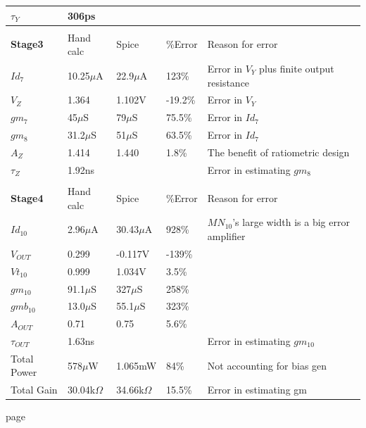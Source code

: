 \documentclass[12pt,a4paper]{article}
\begin{document}
\begin{table}[h]
\begin{tabular}{|l|l|l|l|l|}
\hline
$\tau_Y$ & 306ps  &   &   &   \\
\hline
  &   &   &   &   \\
\hline
\textbf{Stage3} & Hand calc & Spice & \%Error & Reason for error \\
\hline
$Id_7$ & 10.25$\mu$A  & 22.9$\mu$A  & 123\%  & Error in $V_Y$ plus finite output resistance  \\
\hline
$V_Z$ & 1.364 & 1.102V  & -19.2\%  & Error in $V_Y$   \\
\hline
$gm_7$ & 45$\mu$S  & 79$\mu$S  & 75.5\%  &  Error in $Id_7$ \\
\hline
$gm_8$ & 31.2$\mu$S & 51$\mu$S   &  63.5\% &  Error in $Id_7$  \\
\hline
$A_Z$ & 1.414  & 1.440  & 1.8\%  &  The benefit of ratiometric design \\
\hline
$\tau_Z$ & 1.92ns  &   &   &  Error in estimating $gm_{8}$ \\
\hline
  &   &   &   &   \\
\hline
\textbf{Stage4} & Hand calc & Spice & \%Error & Reason for error \\
\hline
$Id_{10}$ & 2.96$\mu$A  &  30.43$\mu$A &  928\% & $MN_{10}$'s large width is a big error amplifier  \\
\hline
$V_{OUT}$ & 0.299 & -0.117V  &  -139\% &   \\
\hline
$Vt_{10}$ & 0.999  & 1.034V  &  3.5\% &   \\
\hline
$gm_{10}$ & 91.1$\mu$S   &  327$\mu$S  & 258\%  &   \\
\hline
$gmb_{10}$ & 13.0$\mu$S  &  55.1$\mu$S  & 323\%  &   \\
\hline
$A_{OUT}$ & 0.71 & 0.75  & 5.6\%  &   \\
\hline
$\tau_{OUT}$ & 1.63ns  &   &   & Error in estimating $gm_{10}$  \\

\hline
Total Power &  578$\mu$W & 1.065mW  & 84\%  & Not accounting for bias gen  \\
\hline
Total Gain & 30.04k$\Omega$  & 34.66k$\Omega$   &  15.5\% & Error in estimating gm  \\
\hline
\end{tabular}
\end{table}

\pagebreak
page
\pagebreak


\end{document}
